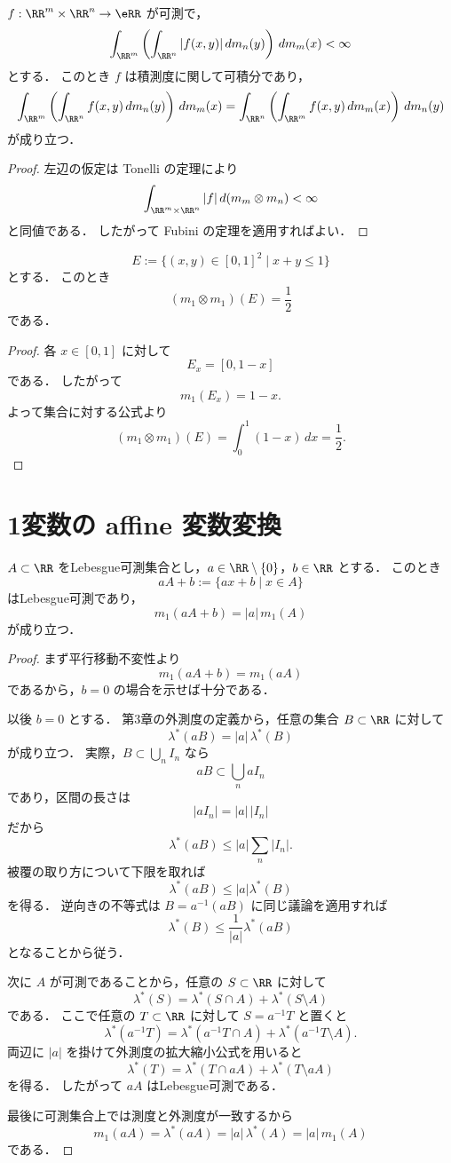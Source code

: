 \begin{corollary}[積分順序の交換]
$f:\RR^m\times\RR^n\to\eRR$ が可測で，
\[
\int_{\RR^m}\left(\int_{\RR^n}|f(x,y)|\,dm_n(y)\right)\,dm_m(x)<\infty
\]
とする．
このとき $f$ は積測度に関して可積分であり，
\[
\int_{\RR^m}\left(\int_{\RR^n}f(x,y)\,dm_n(y)\right)\,dm_m(x)
=
\int_{\RR^n}\left(\int_{\RR^m}f(x,y)\,dm_m(x)\right)\,dm_n(y)
\]
が成り立つ．
\end{corollary}
\begin{proof}
左辺の仮定は Tonelli の定理により
\[
\int_{\RR^m\times\RR^n}|f|\,d(m_m\otimes m_n)<\infty
\]
と同値である．
したがって Fubini の定理を適用すればよい．
\end{proof}

\begin{example}[三角形の面積]
\[
E:=\{(x,y)\in[0,1]^2\mid x+y\le 1\}
\]
とする．
このとき
\[
(m_1\otimes m_1)(E)=\frac12
\]
である．
\end{example}
\begin{proof}
各 $x\in[0,1]$ に対して
\[
E_x=[0,1-x]
\]
である．
したがって
\[
m_1(E_x)=1-x.
\]
よって集合に対する公式より
\[
(m_1\otimes m_1)(E)
=
\int_0^1(1-x)\,dx
=
\frac12.
\]
\end{proof}

\section{1変数の affine 変数変換}

\begin{proposition}
$A\subset\RR$ をLebesgue可測集合とし，$a\in\RR\setminus\{0\}$，$b\in\RR$ とする．
このとき
\[
aA+b:=\{ax+b\mid x\in A\}
\]
はLebesgue可測であり，
\[
m_1(aA+b)=|a|\,m_1(A)
\]
が成り立つ．
\end{proposition}
\begin{proof}
まず平行移動不変性より
\[
m_1(aA+b)=m_1(aA)
\]
であるから，$b=0$ の場合を示せば十分である．

以後 $b=0$ とする．
第3章の外測度の定義から，任意の集合 $B\subset\RR$ に対して
\[
\lambda^*(aB)=|a|\,\lambda^*(B)
\]
が成り立つ．
実際，$B\subset\bigcup_n I_n$ なら
\[
aB\subset\bigcup_n aI_n
\]
であり，区間の長さは
\[
|aI_n|=|a|\,|I_n|
\]
だから
\[
\lambda^*(aB)\le |a|\sum_n |I_n|.
\]
被覆の取り方について下限を取れば
\[
\lambda^*(aB)\le |a|\lambda^*(B)
\]
を得る．
逆向きの不等式は $B=a^{-1}(aB)$ に同じ議論を適用すれば
\[
\lambda^*(B)\le \frac1{|a|}\lambda^*(aB)
\]
となることから従う．

次に $A$ が可測であることから，任意の $S\subset\RR$ に対して
\[
\lambda^*(S)=\lambda^*(S\cap A)+\lambda^*(S\setminus A)
\]
である．
ここで任意の $T\subset\RR$ に対して $S=a^{-1}T$ と置くと
\[
\lambda^*(a^{-1}T)
=
\lambda^*(a^{-1}T\cap A)+\lambda^*(a^{-1}T\setminus A).
\]
両辺に $|a|$ を掛けて外測度の拡大縮小公式を用いると
\[
\lambda^*(T)
=
\lambda^*(T\cap aA)+\lambda^*(T\setminus aA)
\]
を得る．
したがって $aA$ はLebesgue可測である．

最後に可測集合上では測度と外測度が一致するから
\[
m_1(aA)=\lambda^*(aA)=|a|\,\lambda^*(A)=|a|\,m_1(A)
\]
である．
\end{proof}

